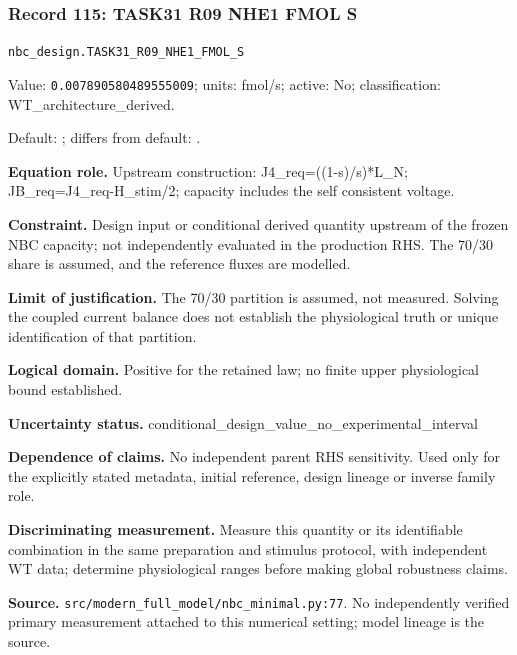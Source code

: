 \subsubsection*{Record 115: TASK31 R09 NHE1 FMOL S}
{\small \nolinkurl{nbc_design.TASK31_R09_NHE1_FMOL_S}\par

Value: \texttt{0.007890580489555009}; units: fmol/s; active: No; classification: WT\_architecture\_derived.\par

Default: ; differs from default: .\par

\textbf{Equation role.} Upstream construction: J4\_req=((1-s)/s)*L\_N; JB\_req=J4\_req-H\_stim/2; capacity includes the self consistent voltage.\par

\textbf{Constraint.} Design input or conditional derived quantity upstream of the frozen NBC capacity; not independently evaluated in the production RHS. The 70/30 share is assumed, and the reference fluxes are modelled.\par

\textbf{Limit of justification.} The 70/30 partition is assumed, not measured. Solving the coupled current balance does not establish the physiological truth or unique identification of that partition.\par

\textbf{Logical domain.} Positive for the retained law; no finite upper physiological bound established.\par

\textbf{Uncertainty status.} conditional\_design\_value\_no\_experimental\_interval\par

\textbf{Dependence of claims.} No independent parent RHS sensitivity. Used only for the explicitly stated metadata, initial reference, design lineage or inverse family role.\par

\textbf{Discriminating measurement.} Measure this quantity or its identifiable combination in the same preparation and stimulus protocol, with independent WT data; determine physiological ranges before making global robustness claims.\par

\textbf{Source.} \nolinkurl{src/modern_full_model/nbc_minimal.py:77}. No independently verified primary measurement attached to this numerical setting; model lineage is the source.\par}

